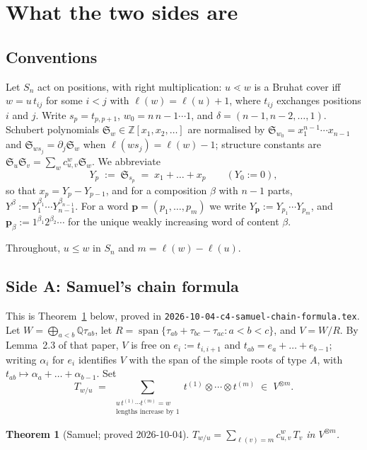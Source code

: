 \documentclass[11pt]{article}
\theoremstyle{plain}
\newtheorem{theorem}{Theorem}[section]
\theoremstyle{definition}
\DeclareMathOperator{\len}{\ell}
\newcommand{\Sch}{\mathfrak{S}}
\newcommand{\pv}{\mathbf{p}}
\begin{document}
\section{What the two sides are}

\subsection{Conventions}

Let $S_n$ act on positions, with right multiplication: $u\lessdot w$ is a Bruhat
cover iff $w=u\,t_{ij}$ for some $i<j$ with $\len(w)=\len(u)+1$, where $t_{ij}$
exchanges positions $i$ and $j$. Write $s_p=t_{p,p+1}$, $w_0=n\,n{-}1\cdots 1$,
and $\delta=(n-1,n-2,\dots,1)$. Schubert polynomials
$\Sch_w\in\mathbb{Z}[x_1,x_2,\dots]$ are normalised by
$\Sch_{w_0}=x_1^{n-1}\cdots x_{n-1}$ and
$\Sch_{ws_j}=\partial_j\Sch_w$ when $\len(ws_j)=\len(w)-1$; structure constants
are $\Sch_u\Sch_v=\sum_w c^w_{u,v}\Sch_w$. We abbreviate
\[
  Y_p \;:=\; \Sch_{s_p} \;=\; x_1+\dots+x_p \qquad (Y_0:=0),
\]
so that $x_p=Y_p-Y_{p-1}$, and for a composition $\beta$ with $n-1$ parts,
$Y^\beta:=Y_1^{\beta_1}\cdots Y_{n-1}^{\beta_{n-1}}$. For a word
$\pv=(p_1,\dots,p_m)$ we write $Y_\pv:=Y_{p_1}\cdots Y_{p_m}$, and
$\pv_\beta:=1^{\beta_1}2^{\beta_2}\cdots$ for the unique weakly increasing word
of content $\beta$.

Throughout, $u\le w$ in $S_n$ and $m=\len(w)-\len(u)$.

\subsection{Side A: Samuel's chain formula}

This is Theorem~\ref{thm:samuel-recalled} below, proved in
\texttt{2026-10-04-c4-samuel-chain-formula.tex}. Let
$W=\bigoplus_{a<b}\mathbb{Q}\tau_{ab}$, let
$R=\operatorname{span}\{\tau_{ab}+\tau_{bc}-\tau_{ac}: a<b<c\}$, and
$V=W/R$. By Lemma~2.3 of that paper, $V$ is free on $e_i:=t_{i,i+1}$ and
$t_{ab}=e_a+\dots+e_{b-1}$; writing $\alpha_i$ for $e_i$ identifies $V$ with the
span of the simple roots of type $A$, with $t_{ab}\mapsto\alpha_a+\dots+\alpha_{b-1}$.
Set
\[
  T_{w/u}\;=\;\sum_{\substack{u\,t^{(1)}\cdots t^{(m)}=w\\ \text{lengths increase by }1}}
  t^{(1)}\otimes\cdots\otimes t^{(m)}\;\in\;V^{\otimes m}.
\]

\begin{theorem}[Samuel; proved 2026-10-04]\label{thm:samuel-recalled}
$T_{w/u}=\sum_{\len(v)=m}c^w_{u,v}\,T_v$ in $V^{\otimes m}$.
\end{theorem}
\end{document}
